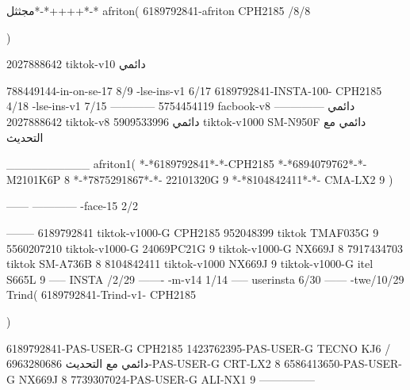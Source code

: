 مجثثل*-*++++*-*
afriton(
6189792841-afriton CPH2185  /8/8

)

2027888642 tiktok-v10
دائمي

788449144-in-on-se-17 8/9
-lse-ins-v1 6/17
6189792841-INSTA-100- CPH2185 4/18
-lse-ins-v1 7/15
------------
5754454119 facbook-v8
دائمي
--------------
2027888642 tiktok-v8
دائمي
5909533996 tiktok-v1000  SM-N950F
دائمي مع التحديث

__________
afriton1(
*-*6189792841*-*-CPH2185
*-*6894079762*-*- M2101K6P   8
*-*7875291867*-*- 22101320G   9\2
*-*8104842411*-*- CMA-LX2   9\4
)


------
------------
-face-15 2/2

--------
6189792841 tiktok-v1000-G CPH2185 
952048399 tiktok TMAF035G 9
5560207210 tiktok-v1000-G 24069PC21G  9 tiktok-v1000-G NX669J  8
7917434703 tiktok  SM-A736B   8
8104842411 tiktok-v1000 NX669J  9 tiktok-v1000-G  itel S665L  9\3
-----
 INSTA /2/29
-------
-m-v14 1/14
-----
userinsta 6/30
------
-twe/10/29
Trind(
6189792841-Trind-v1- CPH2185 

)


6189792841-PAS-USER-G CPH2185 
1423762395-PAS-USER-G TECNO KJ6  /دائمي مع التحديث
6963280686-PAS-USER-G  CRT-LX2  8
6586413650-PAS-USER-G  NX669J  8
7739307024-PAS-USER-G  ALI-NX1  9\4
    ---------------
